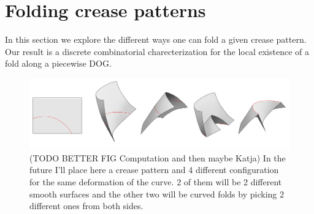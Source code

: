 \section{Folding crease patterns} \label{sec:folding}
In this section we explore the different ways one can fold a given crease pattern. Our result is a discrete combinatorial charecterization for the local existence of a fold along a piecewise DOG.

\begin{figure} [h]
	\centering
	\includegraphics[width=0.7\linewidth]{figures/curved_fold_through_curve.pdf}
	\caption{(TODO BETTER FIG Computation and then maybe Katja) In the future I'll place here a crease pattern and 4 different configuration for the same deformation of the curve. 2 of them will be 2 different smooth surfaces and the other two will be curved folds by picking 2 different ones from both sides. }
	\label{fig:folding_combinatorics}
\end{figure}

